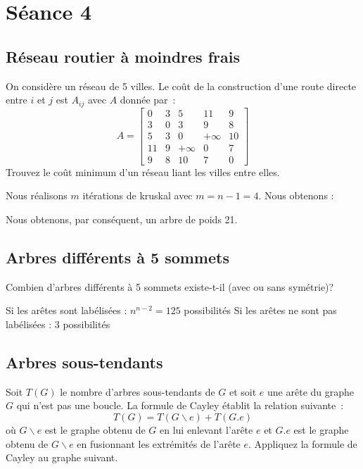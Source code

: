 \section{Séance 4}

\subsection{Réseau routier à moindres frais}
On considère un réseau de 5 villes. Le coût de la construction d'une route directe entre $i$ et $j$ est $A_{ij}$ avec $A$ donnée par~:
\[
  A = \begin{bmatrix}
    0 & 3 & 5 & 11 & 9 \\
    3 & 0 & 3 & 9 & 8 \\
    5 & 3 & 0 & +\infty & 10 \\
    11 & 9 & +\infty & 0 & 7 \\
    9 & 8 & 10 & 7 & 0
  \end{bmatrix}
\]
Trouvez le coût minimum d'un réseau liant les villes entre elles.
\begin{solution}
Nous réalisons $m$ itérations de kruskal avec $m=n-1=4$. Nous obtenons :
\begin{center}
  \end{center}
	Nous obtenons, par conséquent, un arbre de poids 21.
	\end{solution}
\subsection{Arbres différents à 5 sommets}
Combien d'arbres différents à 5 sommets existe-t-il (avec ou sans symétrie)?
\begin{solution}
Si les arêtes sont labélisées : $n^{n-2}=125$ possibilités
Si les arêtes ne sont pas labélisées : $3$ possibilités 
\end{solution}
\subsection{Arbres sous-tendants}
Soit $T(G)$ le nombre d'arbres sous-tendants de $G$ et soit $e$ une arête du graphe $G$ qui n'est pas une boucle. La formule de Cayley établit la relation suivante~:
\[
  T(G) = T(G \backslash e) + T(G.e)
\]
où $G \backslash e$ est le graphe obtenu de $G$ en lui enlevant l'arête $e$ et $G.e$ est le graphe obtenu de $G \backslash e$ en fusionnant les extrémités de l'arête $e$. Appliquez la formule de Cayley au graphe suivant.

